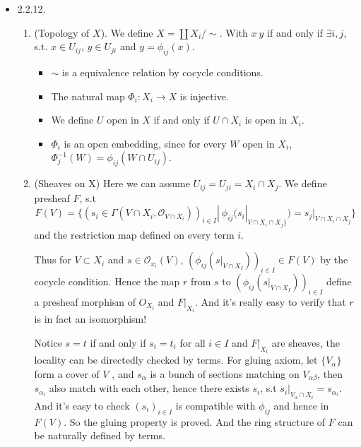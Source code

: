 \documentclass[12pt]{article}
\begin{document}
\begin{itemize}
\item 2.2.12.\
  \begin{enumerate}
  \item (Topology of $X$). We define $X=\coprod X_i/\sim$. With $x~y$ if and only if $\exists{} i,j$, s.t. $x\in U_{ij}$, $y\in U_{ji}$ and $y=\phi_{ij}(x)$.
    \begin{itemize}
    \item $\sim$ is a equivalence relation by cocycle conditions.
    \item The natural map $\Phi_i: X_i\to X$ is injective.
    \item We define $U$ open in $X$ if and only if $U\cap X_i$ is open in $X_i$.
    \item $\Phi_i$ is an open embedding, since for every $W$ open in $X_i$, $\Phi_j^{-1}(W)=\phi_{ij}(W \cap U_{ij})$.
    \end{itemize}
  \item (Sheaves on X) Here we can assume $U_{ij}=U_{ji}=X_i\cap X_j$. We define presheaf $F$, s.t 
$$F(V)=\{(s_i \in \Gamma(V \cap X_i,\mathcal{O}_{V \cap X_i}))_{i\in I}|\  \phi_{ij}(s_i|_{V\cap X_i \cap X_j\}})=s_j|_{V\cap X_i \cap X_j}\}$$ and the restriction map defined on every term $i$.

Thus for $V \subset X_i$ and $s \in \mathcal{O}_{x_i}(V)$, $(\phi_{ij}(s|_{V \cap X_I}))_{i \in I} \in F(V)$ by the cocycle condition. Hence the map $r$ from $s$ to $(\phi_{ij}(s|_{V \cap X_I}))_{i \in I}$ define a presheaf morphism of $O_{X_i}$ and $F|_{X_i}$. And it's really easy to verify that $r$ is in fact an isomorphism!

Notice $s=t$ if and only if $s_i=t_i$ for all $i\in I$ and $F|_{X_i}$ are sheaves, the locality can be directedly checked by terms. For gluing axiom, let $\{V_\alpha\}$ form a cover of $V$ , and $s_\alpha$ is a bunch of sections matching on $V_{\alpha\beta}$, then $s_{\alpha_i}$ also match with each other, hence there exists $s_i$, s.t $s_i|_{V_\alpha \cap X_i}=s_{\alpha_i}$. And it's easy to check $(s_i)_{i\in I}$ is compatible with $\phi_{ij}$ and hence in $F(V)$. So the gluing property is proved. And the ring structure of $F$ can be naturally defined by terms.
  \end{enumerate} 
   

  


\end{itemize}
 
 
\end{document}
